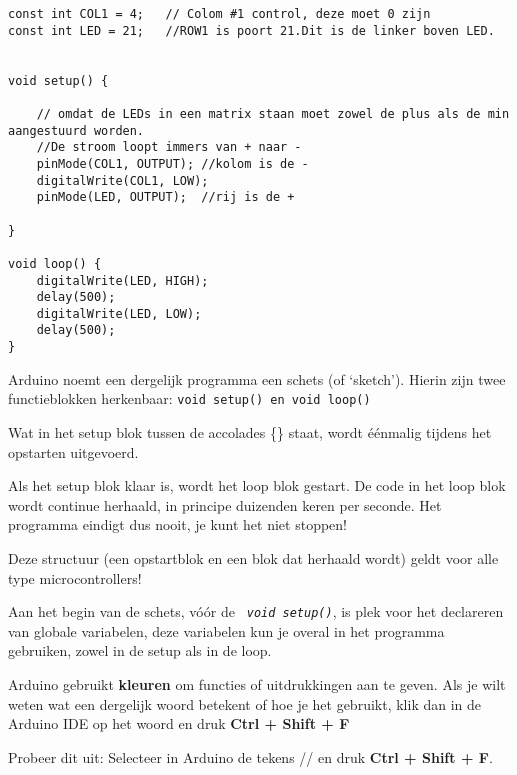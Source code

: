 	


\begin{lstlisting}[caption= Het programma blinkdemo,label={lst:blink},firstnumber=1]		
const int COL1 = 4;   // Colom #1 control, deze moet 0 zijn
const int LED = 21;   //ROW1 is poort 21.Dit is de linker boven LED.


void setup() {
	
	// omdat de LEDs in een matrix staan moet zowel de plus als de min aangestuurd worden.
	//De stroom loopt immers van + naar -
	pinMode(COL1, OUTPUT); //kolom is de -
	digitalWrite(COL1, LOW);
	pinMode(LED, OUTPUT);  //rij is de +
	
}

void loop() {
	digitalWrite(LED, HIGH);
	delay(500);
	digitalWrite(LED, LOW);
	delay(500);
}
\end{lstlisting}

Arduino noemt een dergelijk programma een schets (of ‘sketch’). 
Hierin zijn twee functieblokken herkenbaar: \texttt{{\textcolor{arduinoBlue}{void}} \textcolor{arduinoGreen}{setup}(){} en  \textcolor{arduinoBlue}{void} \textcolor{arduinoGreen}{loop}(){}}

Wat in het setup blok tussen de accolades \{\} staat, wordt éénmalig tijdens het opstarten uitgevoerd.

Als het setup blok klaar is, wordt het loop blok gestart. De code in het loop blok wordt continue herhaald, in principe duizenden keren per seconde. Het programma eindigt dus nooit, je kunt het niet stoppen!

Deze structuur (een opstartblok en een blok dat herhaald wordt) geldt voor alle type microcontrollers!

Aan het begin van de schets, vóór de \texttt{\textit{ \textcolor{arduinoBlue}{void} \textcolor{arduinoGreen}{setup}()}}, is plek voor het declareren van globale variabelen, deze variabelen kun je overal in het programma gebruiken, zowel in de setup als in de loop.

\colorbox{blue!15}{
	\begin{minipage}{\textwidth}
		Arduino gebruikt \textbf{kleuren} om \textcolor{BurntOrange}{functies} of \textcolor{BlueGreen}{uitdrukkingen} aan te geven. Als je wilt weten wat een dergelijk woord betekent of hoe je het gebruikt, klik dan in de Arduino IDE op het woord en druk 
		\colorbox{mygray}{\textbf{Ctrl + Shift + F}}
		
		Probeer dit uit: Selecteer in Arduino de tekens // en druk \colorbox{mygray}{\textbf{Ctrl + Shift + F}}.

	\end{minipage}
}

